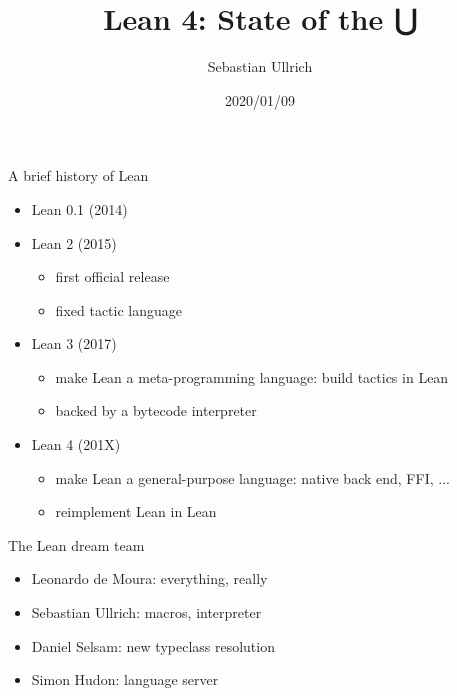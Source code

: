\documentclass[t]{beamer}
\title{Lean 4: State of the ⋃}
\author[Ullrich]{Sebastian Ullrich}
\subtitle{\insertauthor}
\institute[IPD Snelting]{Programming paradigms group - IPD Snelting}
\date{2020/01/09}
\newcommand{\kit}[1]{\textcolor{KITgreen}{#1}}
\begin{document}
\begin{frame}
  \maketitle
\end{frame}

\begin{frame}{A brief history of Lean}
  \begin{itemize}
  \item Lean 0.1 (2014)
  \item Lean 2 (2015)
    \begin{itemize}
    \item first official release
    \item fixed tactic language
    \end{itemize}
  \item Lean 3 (2017)
    \begin{itemize}
    \item make Lean a \kit{meta-programming} language: build tactics in Lean
    \item backed by a bytecode interpreter
    \end{itemize}
  \item Lean 4 (201X)
    \begin{itemize}
    \item make Lean a \kit{general-purpose} language: native back end, FFI, ...
    \item reimplement Lean in Lean
    \end{itemize}
  \end{itemize}
\end{frame}

\begin{frame}{The Lean dream team}
  \begin{itemize}
  \item Leonardo de Moura: everything, really
  \item Sebastian Ullrich: macros, interpreter
  \item<2-> Daniel Selsam: new typeclass resolution
  \item<3-> Simon Hudon: language server
  \end{itemize}
\end{frame}

\end{document}
